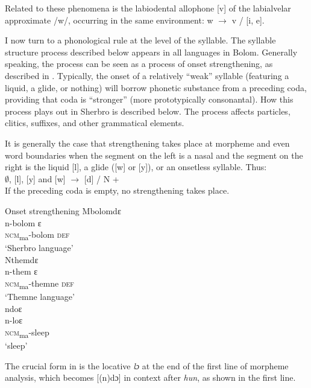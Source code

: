 Related to these phenomena is the labiodental allophone [v] of the labialvelar approximate /w/, occurring in the same environment: w $\xrightarrow{}$ v / {\longrule} [i, e].

I now turn to a phonological rule at the level of the syllable. The syllable structure process described below appears in all languages in Bolom. Generally speaking, the process can be seen as a process of onset strengthening, as described in \citet{Childs1988}. Typically, the onset of a relatively “weak” syllable (featuring a liquid, a glide, or nothing) will borrow phonetic substance from a preceding coda, providing that coda is “stronger” (more prototypically consonantal). How this process plays out in Sherbro is described below. The process affects particles, clitics, suffixes, and other grammatical elements.

It is generally the case that strengthening takes place at morpheme and even word boundaries when the segment on the left is a nasal and the segment on the right is the liquid [l], a glide ([w] or [y]), or an onsetless syllable. Thus:\\


    ${\emptyset}$, [l], [y] and [w] $\xrightarrow{}$ [d] / N + {\longrule}\\


If the preceding coda is empty, no strengthening takes place.

\ea%
    \label{ex:41}
  Onset strengthening
  \ea\label{ex:41a} Mbolomdɛ\\
\gll n-bolom      ɛ\\
\textsc{ncm}\textsubscript{ma}{}-bolom  \textsc{def}\\
\glt ‘Sherbro language'\\

\ex\label{ex:41b} Nthemdɛ\\
\gll n-them      ɛ\\
\textsc{ncm}\textsubscript{ma}{}-themne  \textsc{def}\\
\glt ‘Themne language'\\

\ex\label{ex:41c} ndoɛ\\
\gll n-loɛ\\
\textsc{ncm}\textsubscript{ma}{}-sleep\\
\glt ‘sleep'
\z
\z

The crucial form in  is the locative \textit{lɔ} at the end of the first line of morpheme analysis, which becomes [(n)dɔ] in context after \textit{hun}, as shown in the first line.

